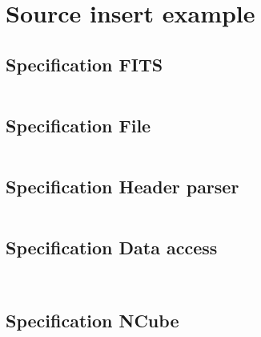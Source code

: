\documentclass[a4paper,10pt]{article}
\begin{document}
\section{Source insert example}

\subsection{Specification FITS}
\inputminted{ada}{../lib/src/fits.ads}

\subsection{Specification File}
\inputminted{ada}{../lib/src/file.ads}

\subsection{Specification Header parser}
\inputminted{ada}{../lib/src/parser/strict.ads}

\subsection{Specification Data access}
\inputminted{ada}{../lib/src/data/generic_data_value.ads}
\inputminted{ada}{../lib/src/data/generic_data_unit.ads}

\subsection{Specification NCube}
\inputminted{ada}{../lib/src/ncube/ncube_funcs.ads}






\end{document}
